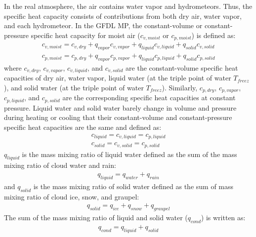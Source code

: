 \documentclass[letterpaper,titlepage,10pt]{article}
\numberwithin{equation}{section}
\begin{document}
In the real atmosphere, the air contains water vapor and hydrometeors. Thus, the specific heat capacity consists of contributions from both dry air, water vapor, and each hydrometeor. In the GFDL MP, the constant-volume or constant-pressure specific heat capacity for moist air ($c_{v,moist}$ or $c_{p,moist}$) is defined as:
\begin{gather}
	c_{v,moist} = c_{v,dry} + q_{vapor} c_{v,vapor} + q_{liquid} c_{v,liquid} + q_{solid} c_{v,solid} \\
	c_{p,moist} = c_{p,dry} + q_{vapor} c_{p,vapor} + q_{liquid} c_{p,liquid} + q_{solid} c_{p,solid}
\end{gather}
where $c_{v,dry}$, $c_{v,vapor}$, $c_{v,liquid}$, and $c_{v,solid}$ are the constant-volume specific heat capacities of dry air, water vapor, liquid water (at the triple point of water $T_{freez}$), and solid water (at the triple point of water $T_{freez}$). Similarly, $c_{p,dry}$, $c_{p,vapor}$, $c_{p,liquid}$, and $c_{p,solid}$ are the corresponding specific heat capacities at constant pressure. Liquid water and solid water barely change in volume and pressure during heating or cooling that their constant-volume and constant-pressure specific heat capacities are the same and defined as:
\begin{gather}
	c_{liquid} = c_{v,liquid} = c_{p,liquid} \\
	c_{solid} = c_{v,solid} = c_{p,solid}
\end{gather}
$q_{liquid}$ is the mass mixing ratio of liquid water defined as the sum of the mass mixing ratio of cloud water and rain:
\begin{gather}
	q_{liquid} = q_{water} + q_{rain}
\end{gather}
and $q_{solid}$ is the mass mixing ratio of solid water defined as the sum of mass mixing ratio of cloud ice, snow, and graupel:
\begin{gather}
	q_{solid} = q_{ice} + q_{snow} + q_{graupel}
\end{gather}
The sum of the mass mixing ratio of liquid and solid water ($q_{cond}$) is written as:
\begin{gather}
	q_{cond} = q_{liquid} + q_{solid}
\end{gather}
\end{document}
